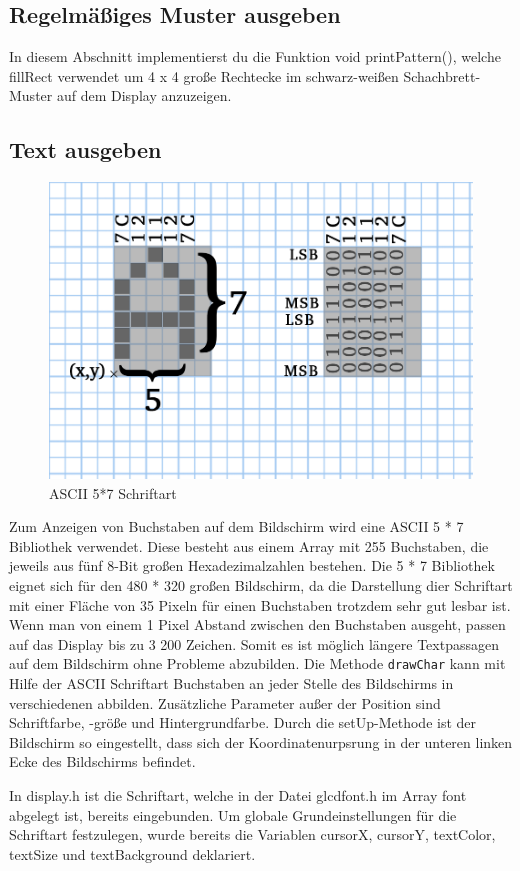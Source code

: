 \subsection{Regelmäßiges Muster ausgeben}
In diesem Abschnitt implementierst du die Funktion void printPattern(), welche fillRect verwendet um 4 x 4 große Rechtecke im schwarz-weißen Schachbrett-Muster auf dem Display anzuzeigen.
\subsection{Text ausgeben}
\begin{figure}
	\begin{centering}
		\includegraphics[width=.5\textwidth]{./05_c/figures/ASCII57.png}
		\caption{ASCII 5*7 Schriftart}
		\label{fig:ascii57}
	\end{centering}
\end{figure}
Zum Anzeigen von Buchstaben auf dem Bildschirm wird eine ASCII 5 * 7 Bibliothek verwendet. Diese besteht aus einem Array mit 255 Buchstaben, die jeweils aus f{\"u}nf 8-Bit gro{\ss}en Hexadezimalzahlen bestehen. Die 5 * 7 Bibliothek eignet sich f{\"u}r den 480 * 320 gro{\ss}en Bildschirm, da die Darstellung dier Schriftart mit einer Fl{\"a}che von 35 Pixeln f{\"u}r einen Buchstaben trotzdem sehr gut lesbar ist. Wenn man von einem 1 Pixel Abstand zwischen den Buchstaben ausgeht, passen auf das Display bis zu 3 200 Zeichen. Somit es ist m{\"o}glich l{\"a}ngere Textpassagen auf dem Bildschirm ohne Probleme abzubilden. Die Methode \texttt{drawChar} kann mit Hilfe der ASCII Schriftart Buchstaben an jeder Stelle des Bildschirms in verschiedenen abbilden. Zus{\"a}tzliche Parameter au{\ss}er der Position sind Schriftfarbe, -gr{\"o}{\ss}e und Hintergrundfarbe. Durch die setUp-Methode ist der Bildschirm so eingestellt, dass sich der Koordinatenurpsrung in der unteren linken Ecke des Bildschirms befindet.  

In display.h ist die Schriftart, welche in der Datei glcdfont.h im Array font abgelegt ist, bereits eingebunden. Um globale Grundeinstellungen für die Schriftart festzulegen, wurde bereits die Variablen cursorX, cursorY, textColor, textSize und textBackground deklariert. 


